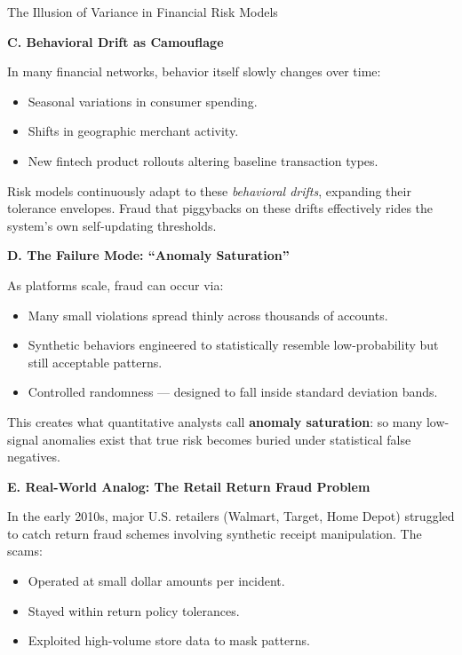 \begin{HistoricalSidebar}{The Illusion of Variance in Financial Risk Models}
    \medskip
    
    \textbf{C. Behavioral Drift as Camouflage}
    
    In many financial networks, behavior itself slowly changes over time:
    
    \begin{itemize}
        \item Seasonal variations in consumer spending.
        \item Shifts in geographic merchant activity.
        \item New fintech product rollouts altering baseline transaction types.
    \end{itemize}
    
    Risk models continuously adapt to these \textit{behavioral drifts}, expanding their tolerance envelopes.  
    Fraud that piggybacks on these drifts effectively rides the system’s own self-updating thresholds.
    
    \medskip
    
    \textbf{D. The Failure Mode: “Anomaly Saturation”}
    
    As platforms scale, fraud can occur via:
    
    \begin{itemize}
        \item Many small violations spread thinly across thousands of accounts.
        \item Synthetic behaviors engineered to statistically resemble low-probability but still acceptable patterns.
        \item Controlled randomness --- designed to fall inside standard deviation bands.
    \end{itemize}
    
    This creates what quantitative analysts call \textbf{anomaly saturation}:  
    so many low-signal anomalies exist that true risk becomes buried under statistical false negatives.
    
    \medskip
    
    \textbf{E. Real-World Analog: The Retail Return Fraud Problem}
    
    In the early 2010s, major U.S. retailers (Walmart, Target, Home Depot) struggled to catch return fraud schemes involving synthetic receipt manipulation.  
    The scams:
    
    \begin{itemize}
        \item Operated at small dollar amounts per incident.
        \item Stayed within return policy tolerances.
        \item Exploited high-volume store data to mask patterns.
    \end{itemize}
    

\end{HistoricalSidebar}
